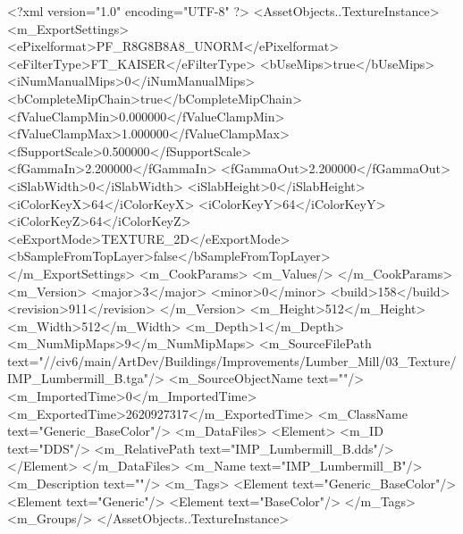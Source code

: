 <?xml version="1.0" encoding="UTF-8" ?>
<AssetObjects..TextureInstance>
	<m_ExportSettings>
		<ePixelformat>PF_R8G8B8A8_UNORM</ePixelformat>
		<eFilterType>FT_KAISER</eFilterType>
		<bUseMips>true</bUseMips>
		<iNumManualMips>0</iNumManualMips>
		<bCompleteMipChain>true</bCompleteMipChain>
		<fValueClampMin>0.000000</fValueClampMin>
		<fValueClampMax>1.000000</fValueClampMax>
		<fSupportScale>0.500000</fSupportScale>
		<fGammaIn>2.200000</fGammaIn>
		<fGammaOut>2.200000</fGammaOut>
		<iSlabWidth>0</iSlabWidth>
		<iSlabHeight>0</iSlabHeight>
		<iColorKeyX>64</iColorKeyX>
		<iColorKeyY>64</iColorKeyY>
		<iColorKeyZ>64</iColorKeyZ>
		<eExportMode>TEXTURE_2D</eExportMode>
		<bSampleFromTopLayer>false</bSampleFromTopLayer>
	</m_ExportSettings>
	<m_CookParams>
		<m_Values/>
	</m_CookParams>
	<m_Version>
		<major>3</major>
		<minor>0</minor>
		<build>158</build>
		<revision>911</revision>
	</m_Version>
	<m_Height>512</m_Height>
	<m_Width>512</m_Width>
	<m_Depth>1</m_Depth>
	<m_NumMipMaps>9</m_NumMipMaps>
	<m_SourceFilePath text="//civ6/main/ArtDev/Buildings/Improvements/Lumber_Mill/03_Texture/IMP_Lumbermill_B.tga"/>
	<m_SourceObjectName text=""/>
	<m_ImportedTime>0</m_ImportedTime>
	<m_ExportedTime>2620927317</m_ExportedTime>
	<m_ClassName text="Generic_BaseColor"/>
	<m_DataFiles>
		<Element>
			<m_ID text="DDS"/>
			<m_RelativePath text="IMP_Lumbermill_B.dds"/>
		</Element>
	</m_DataFiles>
	<m_Name text="IMP_Lumbermill_B"/>
	<m_Description text=""/>
	<m_Tags>
		<Element text="Generic_BaseColor"/>
		<Element text="Generic"/>
		<Element text="BaseColor"/>
	</m_Tags>
	<m_Groups/>
</AssetObjects..TextureInstance>

